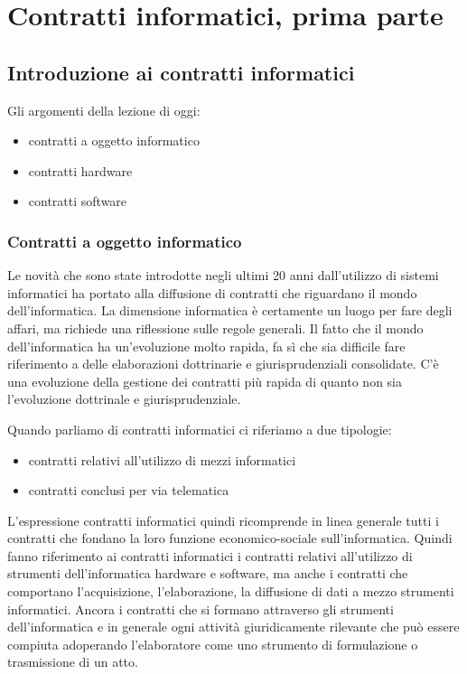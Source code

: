 \chapter{Contratti informatici, prima parte}

\section{Introduzione ai contratti informatici}
Gli argomenti della lezione di oggi:

\begin{itemize}
    \item contratti a oggetto informatico
    \item contratti hardware
    \item contratti software
\end{itemize}

\subsection{Contratti a oggetto informatico}
Le novità che sono state introdotte negli ultimi 20 anni dall'utilizzo di sistemi informatici ha portato alla diffusione di contratti che riguardano il mondo dell'informatica. La dimensione informatica è certamente un luogo per fare degli affari, ma richiede una riflessione sulle regole generali. Il fatto che il mondo dell'informatica ha un'evoluzione molto rapida, fa sì che sia difficile fare riferimento a delle elaborazioni dottrinarie e giurisprudenziali consolidate. C'è una evoluzione della gestione dei contratti più rapida di quanto non sia l'evoluzione dottrinale e giurisprudenziale. 

Quando parliamo di contratti informatici ci riferiamo a due tipologie:

\begin{itemize}
    \item contratti relativi all'utilizzo di mezzi informatici
    \item contratti conclusi per via telematica 
\end{itemize}
L'espressione contratti informatici quindi ricomprende in linea generale tutti i contratti che fondano la loro funzione economico-sociale sull'informatica. Quindi fanno riferimento ai contratti informatici i contratti relativi all'utilizzo di strumenti dell'informatica hardware e software, ma anche i contratti che comportano l'acquisizione, l'elaborazione, la diffusione di dati a mezzo strumenti informatici. Ancora i contratti che si formano attraverso gli strumenti dell'informatica e in generale ogni attività giuridicamente rilevante che può essere compiuta adoperando l'elaboratore come uno strumento di formulazione o trasmissione di un atto. 


